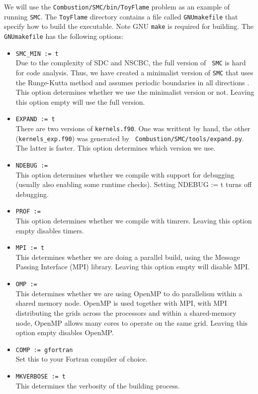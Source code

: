 \documentclass[11pt,letterpaper]{article}
\begin{document}
We will use the {\tt Combustion/SMC/bin/ToyFlame} problem as an
example of running {\tt SMC}.  The {\tt ToyFlame} directory contains
a file called {\tt GNUmakefile} that specify how to build the
executable.  Note GNU {\tt make} is required for building.  The {\tt
  GNUmakefile} has the following options:
\begin{itemize}
\item {\tt SMC\_MIN := t}\\
  Due to the complexity of SDC and NSCBC, the full version of {\tt
    SMC} is hard for code analysis.  Thus, we have created a
  minimalist version of {\tt SMC} that uses the Runge-Kutta method and
  assumes periodic boundaries in all directions .  This option
  determines whether we use the minimalist version or not.  Leaving
  this option empty will use the full version.
\item {\tt EXPAND := t}\\
  There are two versions of {\tt kernels.f90}.  One was writtent by
  hand, the other ({\tt kernels\_exp.f90}) was generated by {\tt
    Combustion/SMC/tools/expand.py}.  The latter is faster.  This option
  determines which version we use.
\item {\tt NDEBUG :=}\\
  This option determines whether we compile with support for debugging
  (usually also enabling some runtime checks). Setting NDEBUG := t
  turns off debugging.
\item {\tt PROF :=}\\
  This option determines whether we compile with timrers. Leaving this
  option empty disables timers.
\item {\tt MPI := t}\\
  This determines whether we are doing a parallel build, using the
  Message Passing Interface (MPI) library. Leaving this
  option empty will disable MPI. 
\item {\tt OMP :=}\\
  This determines whether we are using OpenMP to do parallelism within
  a shared memory node. OpenMP is used together with MPI, with MPI
  distributing the grids across the processors and within a
  shared-memory node, OpenMP allows many cores to operate on the same
  grid.  Leaving this option empty disables OpenMP.
\item {\tt COMP := gfortran}\\
  Set this to your Fortran compiler of choice.
\item {\tt MKVERBOSE := t}\\
  This determines the verbosity of the building process.
\end{itemize} 
\end{document}
